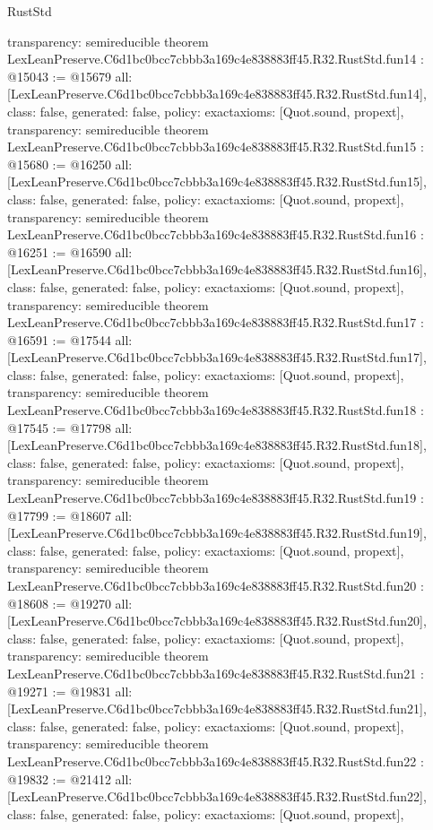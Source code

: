 \begin{lexlean}{RustStd}
\begin{coremodule}
{  transparency: semireducible
}
theorem LexLeanPreserve.C6d1bc0bcc7cbbb3a169c4e838883ff45.R32.RustStd.fun14 : @15043 := @15679 {
  all: [LexLeanPreserve.C6d1bc0bcc7cbbb3a169c4e838883ff45.R32.RustStd.fun14],
  class: false,
  generated: false,
  policy: exact{axioms: [Quot.sound, propext]},
  transparency: semireducible
}
theorem LexLeanPreserve.C6d1bc0bcc7cbbb3a169c4e838883ff45.R32.RustStd.fun15 : @15680 := @16250 {
  all: [LexLeanPreserve.C6d1bc0bcc7cbbb3a169c4e838883ff45.R32.RustStd.fun15],
  class: false,
  generated: false,
  policy: exact{axioms: [Quot.sound, propext]},
  transparency: semireducible
}
theorem LexLeanPreserve.C6d1bc0bcc7cbbb3a169c4e838883ff45.R32.RustStd.fun16 : @16251 := @16590 {
  all: [LexLeanPreserve.C6d1bc0bcc7cbbb3a169c4e838883ff45.R32.RustStd.fun16],
  class: false,
  generated: false,
  policy: exact{axioms: [Quot.sound, propext]},
  transparency: semireducible
}
theorem LexLeanPreserve.C6d1bc0bcc7cbbb3a169c4e838883ff45.R32.RustStd.fun17 : @16591 := @17544 {
  all: [LexLeanPreserve.C6d1bc0bcc7cbbb3a169c4e838883ff45.R32.RustStd.fun17],
  class: false,
  generated: false,
  policy: exact{axioms: [Quot.sound, propext]},
  transparency: semireducible
}
theorem LexLeanPreserve.C6d1bc0bcc7cbbb3a169c4e838883ff45.R32.RustStd.fun18 : @17545 := @17798 {
  all: [LexLeanPreserve.C6d1bc0bcc7cbbb3a169c4e838883ff45.R32.RustStd.fun18],
  class: false,
  generated: false,
  policy: exact{axioms: [Quot.sound, propext]},
  transparency: semireducible
}
theorem LexLeanPreserve.C6d1bc0bcc7cbbb3a169c4e838883ff45.R32.RustStd.fun19 : @17799 := @18607 {
  all: [LexLeanPreserve.C6d1bc0bcc7cbbb3a169c4e838883ff45.R32.RustStd.fun19],
  class: false,
  generated: false,
  policy: exact{axioms: [Quot.sound, propext]},
  transparency: semireducible
}
theorem LexLeanPreserve.C6d1bc0bcc7cbbb3a169c4e838883ff45.R32.RustStd.fun20 : @18608 := @19270 {
  all: [LexLeanPreserve.C6d1bc0bcc7cbbb3a169c4e838883ff45.R32.RustStd.fun20],
  class: false,
  generated: false,
  policy: exact{axioms: [Quot.sound, propext]},
  transparency: semireducible
}
theorem LexLeanPreserve.C6d1bc0bcc7cbbb3a169c4e838883ff45.R32.RustStd.fun21 : @19271 := @19831 {
  all: [LexLeanPreserve.C6d1bc0bcc7cbbb3a169c4e838883ff45.R32.RustStd.fun21],
  class: false,
  generated: false,
  policy: exact{axioms: [Quot.sound, propext]},
  transparency: semireducible
}
theorem LexLeanPreserve.C6d1bc0bcc7cbbb3a169c4e838883ff45.R32.RustStd.fun22 : @19832 := @21412 {
  all: [LexLeanPreserve.C6d1bc0bcc7cbbb3a169c4e838883ff45.R32.RustStd.fun22],
  class: false,
  generated: false,
  policy: exact{axioms: [Quot.sound, propext]},
}
\end{coremodule}
\end{lexlean}
